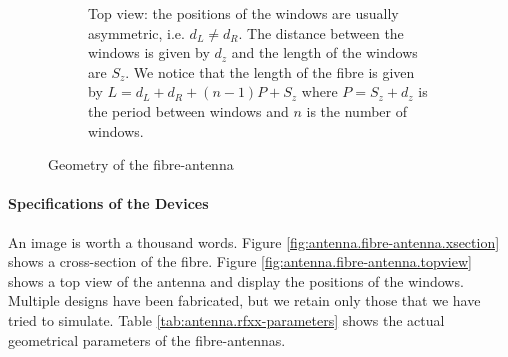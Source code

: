 \begin{figure}
\begin{subfigure}[b]{\textwidth}
   \vspace{0.25cm}
   \caption{Top view: the positions of the windows are usually asymmetric, i.e. $d_L\neq d_R$. The distance between
	    the windows is given by $d_z$ and the length of the windows are $S_z$. We notice that the length of the 
	    fibre is given by $L=d_L+d_R+(n-1)P+S_z$ where $P=S_z+d_z$ is the period between windows and $n$ is the number
	    of windows.}
   \label{fig:active.antennae.fibre-antenna.topview}
  \end{subfigure}
  \caption{Geometry of the fibre-antenna}
  \label{fig:active.antennae.fibre-antenna}
\end{figure}

\paragraph{Specifications of the Devices}
An image is worth a thousand words. Figure \ref{fig:antenna.fibre-antenna.xsection}
shows a cross-section of the fibre. Figure \ref{fig:antenna.fibre-antenna.topview} 
shows a top view of the antenna and display the positions of the windows. 
Multiple designs have been fabricated, but we retain only those that 
we have tried to simulate. Table \ref{tab:antenna.rfxx-parameters} 
shows the actual geometrical parameters of the fibre-antennas.

